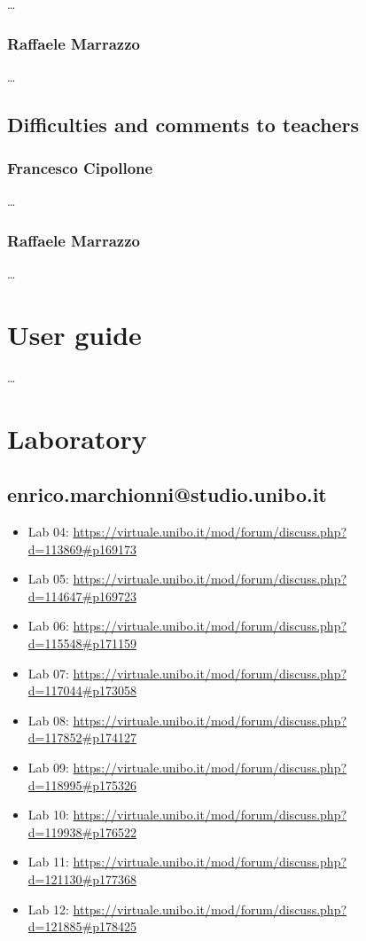 \documentclass[12pt, a4paper]{report}
\begin{document}
    \dots

    \subsection*{Raffaele Marrazzo}

    \dots

\section{Difficulties and comments to teachers}

    \subsection*{Francesco Cipollone}

    \dots

    \subsection*{Raffaele Marrazzo}

    \dots

\appendix

\chapter{User guide}

    \dots

\chapter{Laboratory}

\section{enrico.marchionni@studio.unibo.it}

\begin{itemize}
    \item Lab 04: \url{https://virtuale.unibo.it/mod/forum/discuss.php?d=113869#p169173}
    \item Lab 05: \url{https://virtuale.unibo.it/mod/forum/discuss.php?d=114647#p169723}
    \item Lab 06: \url{https://virtuale.unibo.it/mod/forum/discuss.php?d=115548#p171159}
    \item Lab 07: \url{https://virtuale.unibo.it/mod/forum/discuss.php?d=117044#p173058}
    \item Lab 08: \url{https://virtuale.unibo.it/mod/forum/discuss.php?d=117852#p174127}
    \item Lab 09: \url{https://virtuale.unibo.it/mod/forum/discuss.php?d=118995#p175326}
    \item Lab 10: \url{https://virtuale.unibo.it/mod/forum/discuss.php?d=119938#p176522}
    \item Lab 11: \url{https://virtuale.unibo.it/mod/forum/discuss.php?d=121130#p177368}
    \item Lab 12: \url{https://virtuale.unibo.it/mod/forum/discuss.php?d=121885#p178425}
\end{itemize}

\printbibliography
\end{document}
